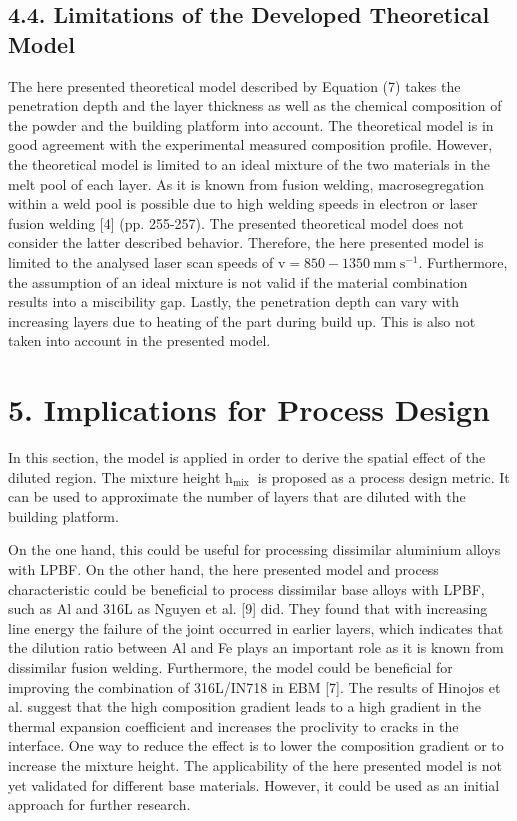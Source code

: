 \documentclass[10pt]{article}
\begin{document}
\subsection*{4.4. Limitations of the Developed Theoretical Model}
The here presented theoretical model described by Equation (7) takes the penetration depth and the layer thickness as well as the chemical composition of the powder and the building platform into account. The theoretical model is in good agreement with the experimental measured composition profile. However, the theoretical model is limited to an ideal mixture of the two materials in the melt pool of each layer. As it is known from fusion welding, macrosegregation within a weld pool is possible due to high welding speeds in electron or laser fusion welding [4] (pp. 255-257). The presented theoretical model does not consider the latter described behavior. Therefore, the here presented model is limited to the analysed laser scan speeds of $\mathrm{v}=850-1350 \mathrm{~mm} \mathrm{~s}^{-1}$. Furthermore, the assumption of an ideal mixture is not valid if the material combination results into a miscibility gap. Lastly, the penetration depth can vary with increasing layers due to heating of the part during build up. This is also not taken into account in the presented model.

\section*{5. Implications for Process Design}
In this section, the model is applied in order to derive the spatial effect of the diluted region. The mixture height $\mathrm{h}_{\text {mix }}$ is proposed as a process design metric. It can be used to approximate the number of layers that are diluted with the building platform.

On the one hand, this could be useful for processing dissimilar aluminium alloys with LPBF. On the other hand, the here presented model and process characteristic could be beneficial to process dissimilar base alloys with LPBF, such as Al and 316L as Nguyen et al. [9] did. They found that with increasing line energy the failure of the joint occurred in earlier layers, which indicates that the dilution ratio between $\mathrm{Al}$ and Fe plays an important role as it is known from dissimilar fusion welding. Furthermore, the model could be beneficial for improving the combination of 316L/IN718 in EBM [7]. The results of Hinojos et al. suggest that the high composition gradient leads to a high gradient in the thermal expansion coefficient and increases the proclivity to cracks in the interface. One way to reduce the effect is to lower the composition gradient or to increase the mixture height. The applicability of the here presented model is not yet validated for different base materials. However, it could be used as an initial approach for further research.
\end{document}
